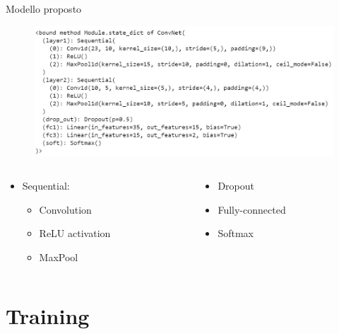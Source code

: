\documentclass[xcolor=x11names,compress, 
					handout %
]{beamer}
\theoremstyle{definition} \newtheorem{esempio}{Esempio}
\theoremstyle{definition}
\begin{document}
		\begin{frame}{Modello proposto}
			\begin{figure}
				\includegraphics[width=1\textwidth]{immagini/ourcnn}
			\end{figure}\pause
			\begin{columns}
				\begin{column}{0.5\textwidth}
					\begin{itemize}
						\item Sequential:\pause
						\begin{itemize}
							\item Convolution\pause
							\item ReLU activation\pause
							\item MaxPool\pause
						\end{itemize}
					\end{itemize}
				\end{column}
				\begin{column}{0.5\textwidth}
					\begin{itemize}
						\item Dropout\pause
						\item Fully-connected\pause
						\item Softmax
					\end{itemize}
				\end{column}
			\end{columns}
		\end{frame}
		
\section{Training}
\end{document}
